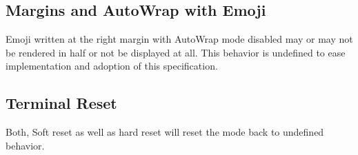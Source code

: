 \documentclass{article}
\begin{document}
\subsection{Margins and AutoWrap with Emoji}

Emoji written at the right margin with \cite{DECAWM} AutoWrap mode disabled
may or may not be rendered in half or not be displayed at all.
This behavior is undefined to ease implementation and adoption 
of this specification.

\subsection{Terminal Reset}

Both, Soft reset \cite{DECSTR} as well as hard reset \cite{RIS}
will reset the mode back to undefined behavior.

\printbibliography[heading=bibintoc,title={References}]
\end{document}
